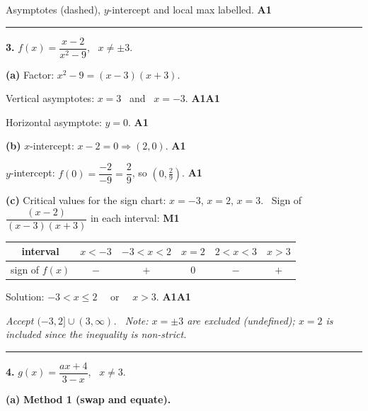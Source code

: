 \documentclass[12pt, twoside]{article}
\begin{document}
Asymptotes (dashed), $y$-intercept and local max labelled. \hfill \textbf{A1}

\bigskip\hrule\bigskip

\noindent\textbf{3.} $\displaystyle f(x)=\dfrac{x-2}{x^{2}-9}$, \ $x\ne\pm 3$.

\medskip

\textbf{(a)} Factor: $x^{2}-9=(x-3)(x+3)$.

Vertical asymptotes: $x=3$ \ and \ $x=-3$. \hfill \textbf{A1A1}

Horizontal asymptote: $y=0$. \hfill \textbf{A1}

\medskip

\textbf{(b)} $x$-intercept: $x-2=0 \Rightarrow (2,0)$. \hfill \textbf{A1}

$y$-intercept: $f(0)=\dfrac{-2}{-9}=\dfrac{2}{9}$, so $\left(0,\tfrac{2}{9}\right)$.
\hfill \textbf{A1}

\medskip

\textbf{(c)} Critical values for the sign chart: $x=-3$, $x=2$, $x=3$.
\ Sign of $\dfrac{(x-2)}{(x-3)(x+3)}$ in each interval: \hfill \textbf{M1}

\smallskip

\begin{center}
\renewcommand{\arraystretch}{1.2}
\begin{tabular}{c|ccccc}
interval & $x<-3$ & $-3<x<2$ & $x=2$ & $2<x<3$ & $x>3$ \\
\hline
sign of $f(x)$ & $-$ & $+$ & $0$ & $-$ & $+$
\end{tabular}
\end{center}

\smallskip

Solution: $-3<x\le 2$ \ \ or \ \ $x>3$. \hfill \textbf{A1A1}

\emph{Accept $(-3,2]\cup(3,\infty)$. \ Note: $x=\pm 3$ are excluded (undefined);
$x=2$ is included since the inequality is non-strict.}

\bigskip\hrule\bigskip

\noindent\textbf{4.} $\displaystyle g(x)=\dfrac{ax+4}{3-x}$, \ $x\ne 3$.

\medskip

\textbf{(a)} \textbf{Method 1 (swap and equate).}
\end{document}
